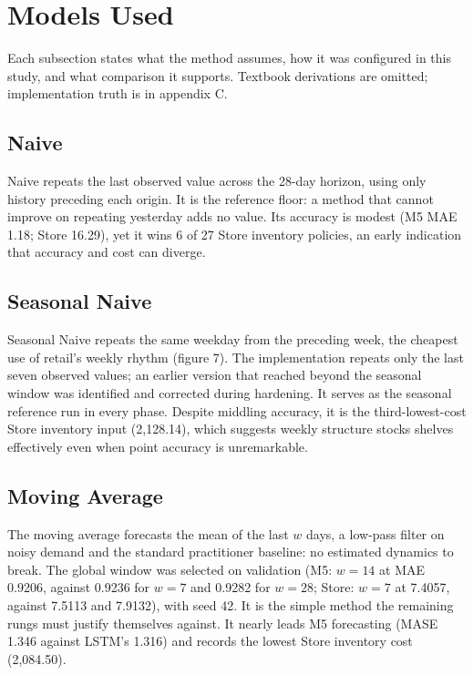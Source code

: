 \section{Models Used}
\label{sec:models}
Each subsection states what the method assumes, how it was configured in this
study, and what comparison it supports. Textbook derivations are omitted;
implementation truth is in appendix C.

\subsection{Naive}
\label{sec:m-naive}
Naive repeats the last observed value across the 28-day horizon, using only
history preceding each origin. It is the reference floor: a method that cannot
improve on repeating yesterday adds no value. Its accuracy is modest (M5 MAE
1.18; Store 16.29), yet it wins 6 of 27 Store inventory policies, an early
indication that accuracy and cost can diverge.

\subsection{Seasonal Naive}
\label{sec:m-snaive}
Seasonal Naive repeats the same weekday from the preceding week, the cheapest
use of retail's weekly rhythm (figure 7). The implementation repeats
only the last seven observed values; an earlier version that reached beyond
the seasonal window was identified and corrected during hardening. It serves
as the seasonal reference run in every phase. Despite middling accuracy, it is
the third-lowest-cost Store inventory input (2,128.14), which suggests weekly
structure stocks shelves effectively even when point accuracy is unremarkable.

\subsection{Moving Average}
\label{sec:m-ma}
The moving average forecasts the mean of the last $w$ days, a low-pass filter
on noisy demand and the standard practitioner baseline: no estimated dynamics
to break. The global window was selected on validation (M5: $w=14$ at MAE
0.9206, against 0.9236 for $w=7$ and 0.9282 for $w=28$; Store: $w=7$ at 7.4057,
against 7.5113 and 7.9132), with seed 42. It is the simple method the
remaining rungs must justify themselves against. It nearly leads M5
forecasting (MASE 1.346 against LSTM's 1.316) and records the lowest Store
inventory cost (2,084.50).

